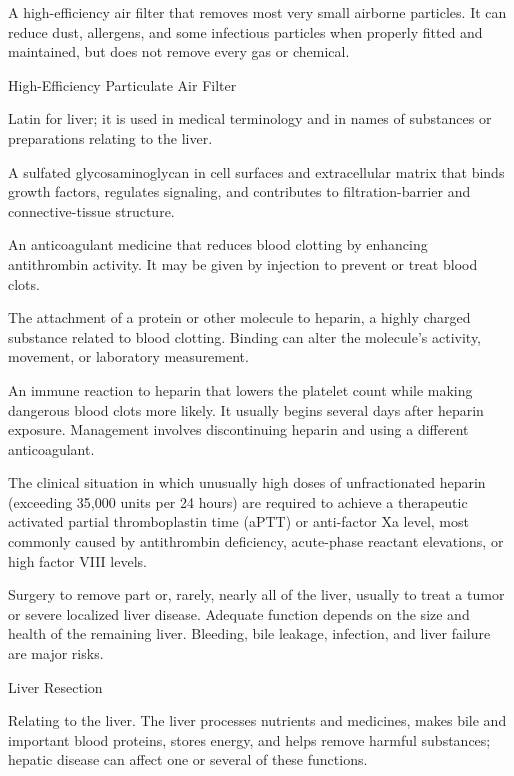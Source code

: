  A high-efficiency air filter that removes most very small airborne particles. It can reduce dust, allergens, and some infectious particles when properly fitted and maintained, but does not remove every gas or chemical.

\synonyms
High-Efficiency Particulate Air Filter

 Latin for liver; it is used in medical terminology and in names of substances or preparations relating to the liver.

 A sulfated glycosaminoglycan in cell surfaces and extracellular matrix that binds growth factors, regulates signaling, and contributes to filtration-barrier and connective-tissue structure.

 An anticoagulant medicine that reduces blood clotting by enhancing antithrombin activity. It may be given by injection to prevent or treat blood clots.

 The attachment of a protein or other molecule to heparin, a highly charged substance related to blood clotting. Binding can alter the molecule’s activity, movement, or laboratory measurement.

 An immune reaction to heparin that lowers the platelet count while making dangerous blood clots more likely. It usually begins several days after heparin exposure. Management involves discontinuing heparin and using a different anticoagulant.

 The clinical situation in which unusually high doses of unfractionated heparin (exceeding 35,000 units per 24 hours) are required to achieve a therapeutic activated partial thromboplastin time (aPTT) or anti-factor Xa level, most commonly caused by antithrombin deficiency, acute-phase reactant elevations, or high factor VIII levels.

 Surgery to remove part or, rarely, nearly all of the liver, usually to treat a tumor or severe localized liver disease. Adequate function depends on the size and health of the remaining liver. Bleeding, bile leakage, infection, and liver failure are major risks.

\synonyms
Liver Resection

 Relating to the liver. The liver processes nutrients and medicines, makes bile and important blood proteins, stores energy, and helps remove harmful substances; hepatic disease can affect one or several of these functions.

